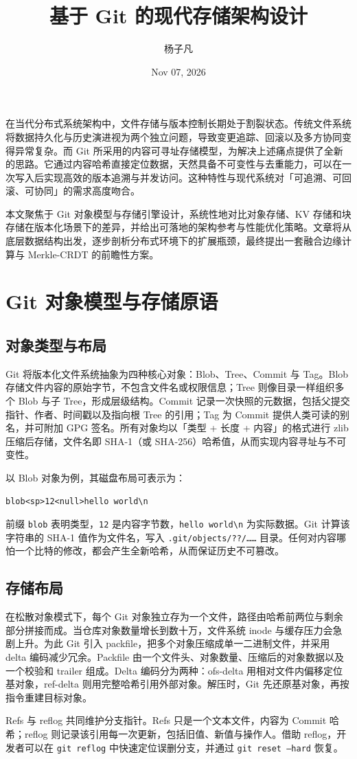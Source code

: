 \title{基于 Git 的现代存储架构设计}
\author{杨子凡}
\date{Nov 07, 2026}
\maketitle
在当代分布式系统架构中，文件存储与版本控制长期处于割裂状态。传统文件系统将数据持久化与历史演进视为两个独立问题，导致变更追踪、回滚以及多方协同变得异常复杂。而 Git 所采用的内容可寻址存储模型，为解决上述痛点提供了全新的思路。它通过内容哈希直接定位数据，天然具备不可变性与去重能力，可以在一次写入后实现高效的版本追溯与并发访问。这种特性与现代系统对「可追溯、可回滚、可协同」的需求高度吻合。\par
本文聚焦于 Git 对象模型与存储引擎设计，系统性地对比对象存储、KV 存储和块存储在版本化场景下的差异，并给出可落地的架构参考与性能优化策略。文章将从底层数据结构出发，逐步剖析分布式环境下的扩展瓶颈，最终提出一套融合边缘计算与 Merkle-CRDT 的前瞻性方案。\par
\chapter{Git 对象模型与存储原语}
\section{对象类型与布局}
Git 将版本化文件系统抽象为四种核心对象：Blob、Tree、Commit 与 Tag。Blob 存储文件内容的原始字节，不包含文件名或权限信息；Tree 则像目录一样组织多个 Blob 与子 Tree，形成层级结构。Commit 记录一次快照的元数据，包括父提交指针、作者、时间戳以及指向根 Tree 的引用；Tag 为 Commit 提供人类可读的别名，并可附加 GPG 签名。所有对象均以「类型 + 长度 + 内容」的格式进行 zlib 压缩后存储，文件名即 SHA-1（或 SHA-256）哈希值，从而实现内容寻址与不可变性。\par
以 Blob 对象为例，其磁盘布局可表示为：\par
\begin{lstlisting}[language=text]
blob<sp>12<null>hello world\n
\end{lstlisting}
前缀 \texttt{blob} 表明类型，\texttt{12} 是内容字节数，\texttt{hello world\textbackslash{}n} 为实际数据。Git 计算该字符串的 SHA-1 值作为文件名，写入 \texttt{.git/objects/??/……} 目录。任何对内容哪怕一个比特的修改，都会产生全新哈希，从而保证历史不可篡改。\par
\section{存储布局}
在松散对象模式下，每个 Git 对象独立存为一个文件，路径由哈希前两位与剩余部分拼接而成。当仓库对象数量增长到数十万，文件系统 inode 与缓存压力会急剧上升。为此 Git 引入 packfile，把多个对象压缩成单一二进制文件，并采用 delta 编码减少冗余。Packfile 由一个文件头、对象数量、压缩后的对象数据以及一个校验和 trailer 组成。Delta 编码分为两种：ofs-delta 用相对文件内偏移定位基对象，ref-delta 则用完整哈希引用外部对象。解压时，Git 先还原基对象，再按指令重建目标对象。\par
Refs 与 reflog 共同维护分支指针。Refs 只是一个文本文件，内容为 Commit 哈希；reflog 则记录该引用每一次更新，包括旧值、新值与操作人。借助 reflog，开发者可以在 \texttt{git reflog} 中快速定位误删分支，并通过 \texttt{git reset --hard} 恢复。\par

